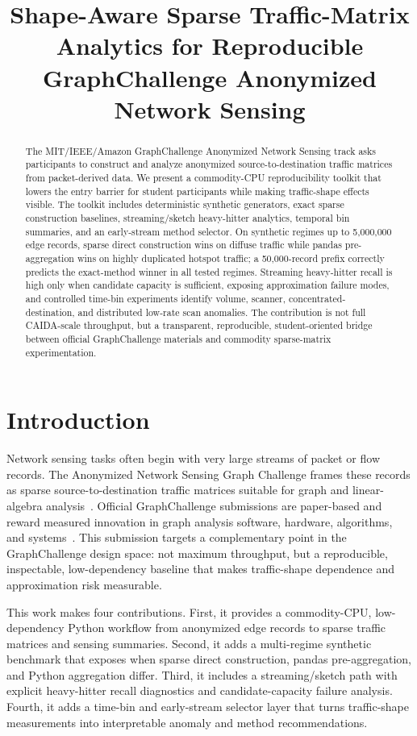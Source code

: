 \documentclass[conference]{IEEEtran}
\title{Shape-Aware Sparse Traffic-Matrix Analytics for Reproducible GraphChallenge Anonymized Network Sensing}
\author{
\IEEEauthorblockN{Qifan Chen}
\IEEEauthorblockA{University of California, Santa Barbara\\
qifan\_chen@ucsb.edu}
}
\begin{document}
\maketitle

\begin{abstract}
The MIT/IEEE/Amazon GraphChallenge Anonymized Network Sensing track asks participants to construct and analyze anonymized source-to-destination traffic matrices from packet-derived data. We present a commodity-CPU reproducibility toolkit that lowers the entry barrier for student participants while making traffic-shape effects visible. The toolkit includes deterministic synthetic generators, exact sparse construction baselines, streaming/sketch heavy-hitter analytics, temporal bin summaries, and an early-stream method selector. On synthetic regimes up to 5,000,000 edge records, sparse direct construction wins on diffuse traffic while pandas pre-aggregation wins on highly duplicated hotspot traffic; a 50,000-record prefix correctly predicts the exact-method winner in all tested regimes. Streaming heavy-hitter recall is high only when candidate capacity is sufficient, exposing approximation failure modes, and controlled time-bin experiments identify volume, scanner, concentrated-destination, and distributed low-rate scan anomalies. The contribution is not full CAIDA-scale throughput, but a transparent, reproducible, student-oriented bridge between official GraphChallenge materials and commodity sparse-matrix experimentation.
\end{abstract}

\section{Introduction}
Network sensing tasks often begin with very large streams of packet or flow records. The Anonymized Network Sensing Graph Challenge frames these records as sparse source-to-destination traffic matrices suitable for graph and linear-algebra analysis~\cite{anonymizedNetworkSensing2024}. Official GraphChallenge submissions are paper-based and reward measured innovation in graph analysis software, hardware, algorithms, and systems~\cite{graphchallenge2026,graphchallengeSubmit2026}. This submission targets a complementary point in the GraphChallenge design space: not maximum throughput, but a reproducible, inspectable, low-dependency baseline that makes traffic-shape dependence and approximation risk measurable.

This work makes four contributions. First, it provides a commodity-CPU, low-dependency Python workflow from anonymized edge records to sparse traffic matrices and sensing summaries. Second, it adds a multi-regime synthetic benchmark that exposes when sparse direct construction, pandas pre-aggregation, and Python aggregation differ. Third, it includes a streaming/sketch path with explicit heavy-hitter recall diagnostics and candidate-capacity failure analysis. Fourth, it adds a time-bin and early-stream selector layer that turns traffic-shape measurements into interpretable anomaly and method recommendations.
\end{document}
